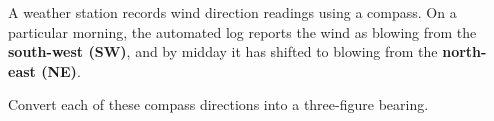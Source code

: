 \begin{question}
\noindent A weather station records wind direction readings using a compass. On a particular morning, the automated log reports the wind as blowing from the \textbf{south-west (SW)}, and by midday it has shifted to blowing from the \textbf{north-east (NE)}.

\noindent Convert each of these compass directions into a three-figure bearing.

\vspace{4cm}

\begin{flushright}
\end{flushright}
\end{question}

